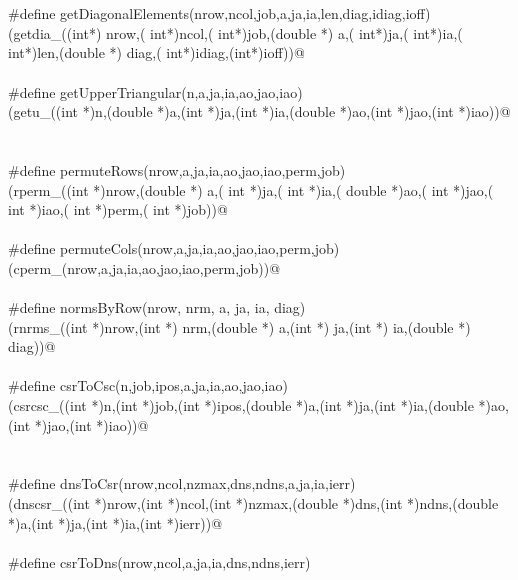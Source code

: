 \documentclass[12pt]{article}
\begin{document}
\begin{flushleft}
\begin{minipage}{\linewidth}
\begin{list}{}{}
\mbox{}\verb@@\\
\mbox{}\verb@@\\
\mbox{}\verb@#define getDiagonalElements(nrow,ncol,job,a,ja,ia,len,diag,idiag,ioff)\@\\
\mbox{}\verb@(getdia_((int*) nrow,( int*)ncol,( int*)job,(double *) a,( int*)ja,( int*)ia,( int*)len,(double *) diag,( int*)idiag,(int*)ioff))@\\
\mbox{}\verb@@\\
\mbox{}\verb@#define getUpperTriangular(n,a,ja,ia,ao,jao,iao)\@\\
\mbox{}\verb@(getu_((int *)n,(double *)a,(int *)ja,(int *)ia,(double *)ao,(int *)jao,(int *)iao))@\\
\mbox{}\verb@@\\
\mbox{}\verb@@\\
\mbox{}\verb@#define permuteRows(nrow,a,ja,ia,ao,jao,iao,perm,job) \@\\
\mbox{}\verb@(rperm_((int *)nrow,(double *) a,( int *)ja,( int *)ia,( double *)ao,( int *)jao,( int *)iao,( int *)perm,( int *)job))@\\
\mbox{}\verb@@\\
\mbox{}\verb@#define permuteCols(nrow,a,ja,ia,ao,jao,iao,perm,job) \@\\
\mbox{}\verb@(cperm_(nrow,a,ja,ia,ao,jao,iao,perm,job))@\\
\mbox{}\verb@@\\
\mbox{}\verb@#define normsByRow(nrow, nrm, a, ja, ia, diag) \@\\
\mbox{}\verb@(rnrms_((int *)nrow,(int *) nrm,(double *) a,(int *) ja,(int *) ia,(double *) diag))@\\
\mbox{}\verb@@\\
\mbox{}\verb@#define csrToCsc(n,job,ipos,a,ja,ia,ao,jao,iao) \@\\
\mbox{}\verb@ (csrcsc_((int *)n,(int *)job,(int *)ipos,(double *)a,(int *)ja,(int *)ia,(double *)ao,(int *)jao,(int *)iao))@\\
\mbox{}\verb@@\\
\mbox{}\verb@@\\
\mbox{}\verb@#define dnsToCsr(nrow,ncol,nzmax,dns,ndns,a,ja,ia,ierr)\@\\
\mbox{}\verb@(dnscsr_((int *)nrow,(int *)ncol,(int *)nzmax,(double *)dns,(int *)ndns,(double *)a,(int *)ja,(int *)ia,(int *)ierr))@\\
\mbox{}\verb@@\\
\mbox{}\verb@#define csrToDns(nrow,ncol,a,ja,ia,dns,ndns,ierr) \@\\

\end{list}
\end{minipage}
\end{flushleft}
\end{document}
